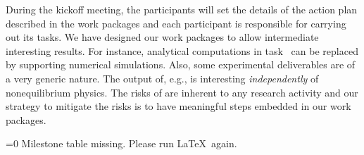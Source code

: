 During the kickoff meeting, the participants will set the details of the action plan
described in the work packages and each participant is responsible for carrying out its
tasks.
%
We have designed our work packages to allow intermediate interesting results. For instance,
analytical computations in task~ can be replaced by
supporting numerical simulations.
%
Also, some experimental deliverables are of a very generic nature. The output of, e.g.,
 is interesting {\em independently} of nonequilibrium
physics.
%
The risks of \TheProject are inherent to any research activity and our strategy to mitigate
the risks is to have meaningful steps embedded in our work packages.

\makeatletter
\ifnum{}=0
Milestone table missing. Please run \LaTeX\ again.%
\else%
\milestonetable%
\fi
\makeatother
